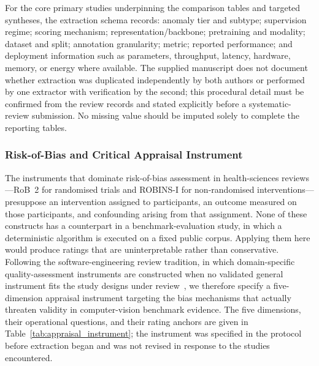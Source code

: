 \documentclass[10pt,a4paper]{article}
\begin{document}
For the core primary studies underpinning the comparison tables and targeted syntheses, the extraction schema records: anomaly tier and subtype; supervision regime; scoring mechanism; representation/backbone; pretraining and modality; dataset and split; annotation granularity; metric; reported performance; and deployment information such as parameters, throughput, latency, hardware, memory, or energy where available. The supplied manuscript does not document whether extraction was duplicated independently by both authors or performed by one extractor with verification by the second; this procedural detail must be confirmed from the review records and stated explicitly before a systematic-review submission. No missing value should be imputed solely to complete the reporting tables. \subsubsection{Risk-of-Bias and Critical Appraisal Instrument}
\label{subsubsec:appraisal}

The instruments that dominate risk-of-bias assessment in health-sciences reviews---RoB~2 for randomised trials and ROBINS-I for non-randomised interventions---presuppose an intervention assigned to participants, an outcome measured on those participants, and confounding arising from that assignment. None of these constructs has a counterpart in a benchmark-evaluation study, in which a deterministic algorithm is executed on a fixed public corpus. Applying them here would produce ratings that are uninterpretable rather than conservative. Following the software-engineering review tradition, in which domain-specific quality-assessment instruments are constructed when no validated general instrument fits the study designs under review~\citep{kitchenham2007guidelines, kitchenham2009systematic}, we therefore specify a five-dimension appraisal instrument targeting the bias mechanisms that actually threaten validity in computer-vision benchmark evidence. The five dimensions, their operational questions, and their rating anchors are given in Table~\ref{tab:appraisal_instrument}; the instrument was specified in the protocol before extraction began and was not revised in response to the studies encountered.
\end{document}

